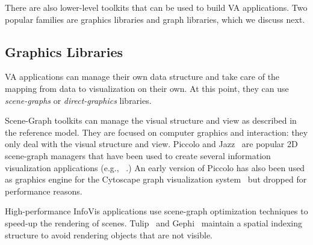 There are also lower-level toolkits that can be used to build VA
applications.  Two popular families are graphics libraries
and graph libraries, which we discuss next.


\subsection{Graphics Libraries}

VA applications can manage their own data structure and
take care of the mapping from data to visualization on their own.  At
this point, they can use \emph{scene-graphs} or \emph{direct-graphics}
libraries.  

Scene-Graph toolkits can manage the visual structure and view as
described in the reference model.  They are focused on computer
graphics and interaction: they only deal with the visual structure and
view.  Piccolo and Jazz~\cite{Polylithic} are popular 2D scene-graph
managers that have been used to create several information
visualization applications (e.g., ~\cite{Geneaquilt,SpaceTree}.) An
early version of Piccolo has also been used as graphics engine for the
Cytoscape graph visualization system~\cite{Cytoscape} but dropped for
performance reasons.

High-performance InfoVis applications use scene-graph optimization
techniques to speed-up the rendering of scenes.  Tulip~\cite{Tulip}
and Gephi~\cite{Gephi} maintain a spatial indexing structure to avoid
rendering objects that are not visible.

